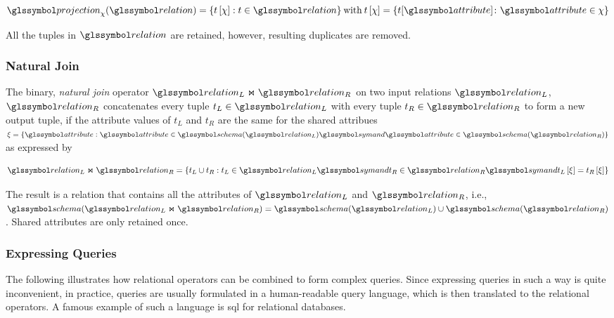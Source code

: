 \begin{equation}
    \label{equation:rel_op_projection}
    \projection_{\chi}(\relation) = \{ t\left[ \chi \right] : t \in \relation \} \: \textrm{with} \: t\left[ \chi \right] = \{ t[\attribute] \colon \attribute \in \chi \}
\end{equation}

All the tuples in $\relation$ are retained, however, resulting duplicates are removed.

\subsubsection{Natural Join}

The binary, \emph{natural join} operator $\relation_L \Join \relation_R$ on two input relations $\relation_L$, $\relation_R$ concatenates every tuple $t_{L} \in \relation_L$ with every tuple $t_{R} \in \relation_R$ to form a new output tuple, if the attribute values of $t_{L}$ and $t_{R}$ are the same for the shared attribues $\xi = \{ \attribute : \attribute \in \schema(\relation_L) \symand \attribute \in \schema(\relation_R) \}$ as expressed by 

\begin{equation}
    \label{equation:rel_op_join}
    \relation_L \Join \relation_R = \{ t_L \cup t_R : t_L \in \relation_L \symand t_R \in \relation_R \symand t_L\left[ \xi \right] = t_R\left[ \xi \right] \}
\end{equation}

The result is a relation that contains all the attributes of $\relation_L$ and $\relation_R$, i.e., $\schema(\relation_L \Join \relation_R) = \schema(\relation_L) \cup \schema(\relation_R)$. Shared attributes are only retained once.

\subsubsection{Expressing Queries}

The following  illustrates how relational operators can be combined to form complex queries. Since expressing queries in such a way is quite inconvenient, in practice, queries are usually formulated in a human-readable query language, which is then translated to the relational operators. A famous example of such a language is \acrshort{sql} \cite{Chamberlin:2012Early} for relational databases.

